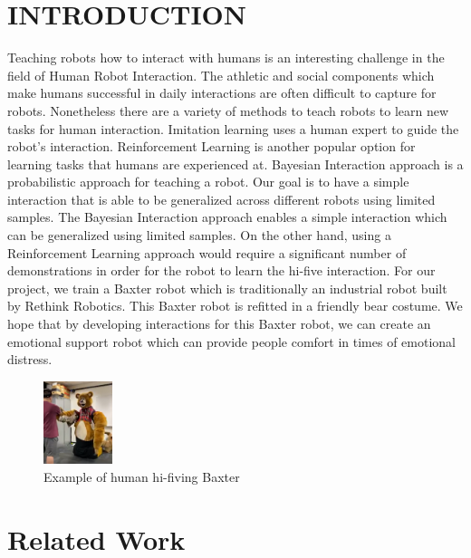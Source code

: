 \documentclass[letterpaper, 10 pt, conference]{ieeeconf}  %
\begin{document}
\section{INTRODUCTION}
Teaching robots how to interact with humans is an interesting challenge in the field of Human Robot Interaction. The athletic and social components which make humans successful in daily interactions are often difficult to capture for robots. Nonetheless there are a variety of methods to teach robots to learn new tasks for human interaction. Imitation learning uses a human expert to guide the robot's interaction. Reinforcement Learning is another popular option for learning tasks that humans are experienced at. Bayesian Interaction approach is a probabilistic approach for teaching a robot.
\newline
\indent Our goal is to have a simple interaction that is able to be generalized across different robots using limited samples. The Bayesian Interaction approach enables a simple interaction which can be generalized using limited samples. On the other hand, using a Reinforcement Learning approach would require a significant number of demonstrations in order for the robot to learn the hi-five interaction.
\newline
\indent For our project, we train a Baxter robot which is traditionally an industrial robot built by Rethink Robotics. This Baxter robot is refitted in a friendly bear costume. We hope that by developing interactions for this Baxter robot, we can create an emotional support robot which can provide people comfort in times of emotional distress.
\newline
\begin{figure}[h]
\centering
\includegraphics[width=0.18\textwidth]{Bear.PNG}
\caption{Example of human hi-fiving Baxter}
\end{figure}

\section{Related Work}
\end{document}
